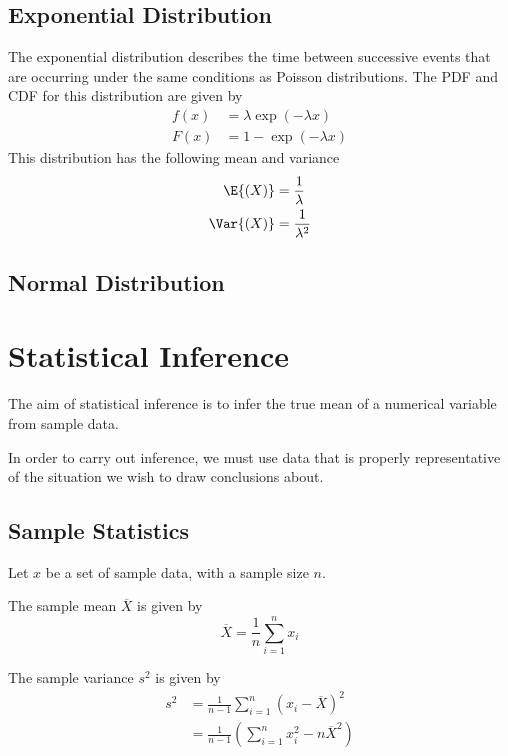 \documentclass{article}
\begin{document}
\subsection{Exponential Distribution}
The exponential distribution describes the time between successive events that are occurring under the same conditions as Poisson
distributions. The PDF and CDF for this distribution are given by
\begin{align*}
    f(x) & = \lambda \exp{\left( -\lambda x \right)} \\
    F(x) & = 1 - \exp{\left( -\lambda x \right)}
\end{align*}
This distribution has the following mean and variance
\begin{align*}
    \E{\left( X \right)}   & = \frac{1}{\lambda}   \\
    \Var{\left( X \right)} & = \frac{1}{\lambda^2}
\end{align*}
\subsection{Normal Distribution}
\section{Statistical Inference}
The aim of statistical inference is to infer the true mean of a numerical variable from sample data.

In order to carry out inference, we must use data that is properly representative of the situation we wish to draw conclusions about.
\subsection{Sample Statistics}
Let \(x\) be a set of sample data, with a sample size \(n\).
\begin{theorem}
    The sample mean \(\overline{X}\) is given by
    \begin{equation*}
        \overline{X} = \frac{1}{n} \sum_{i = 1}^{n} x_i
    \end{equation*}
\end{theorem}
\begin{theorem}
    The sample variance \(s^2\) is given by
    \begin{align*}
        s^2 & = \frac{1}{n - 1} \sum_{i = 1}^{n} \left( x_i - \overline{X} \right)^2     \\
            & = \frac{1}{n - 1} \left( \sum_{i = 1}^{n} x_i^2 - n \overline{X}^2 \right)
    \end{align*}
\end{theorem}
\end{document}
